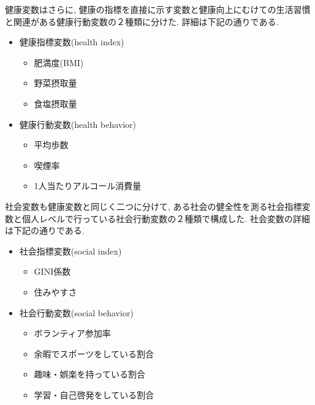 健康変数はさらに, 健康の指標を直接に示す変数と健康向上にむけての生活習慣と関連がある健康行動変数の２種類に分けた. 詳細は下記の通りである.
\begin{itemize} \setlength{\itemsep}{-0.5mm} \setlength{\parskip}{-0.5mm}
	\item 健康指標変数(health index)
	      \begin{itemize} \setlength{\itemsep}{-0.5mm} \setlength{\parskip}{-0.5mm}
		      \item 	肥満度(BMI)
		      \item 	野菜摂取量
		      \item 	食塩摂取量
	      \end{itemize}

	\item 健康行動変数(health behavior)
	      \begin{itemize} \setlength{\itemsep}{-0.5mm} \setlength{\parskip}{-0.5mm}
		      \item 	平均歩数
		      \item 	喫煙率
		      \item 	1人当たりアルコール消費量
	      \end{itemize}
\end{itemize}

社会変数も健康変数と同じく二つに分けて, ある社会の健全性を測る社会指標変数と個人レベルで行っている社会行動変数の２種類で構成した. 社会変数の詳細は下記の通りである.

\begin{itemize} \setlength{\itemsep}{-0.5mm} \setlength{\parskip}{-0.5mm}
	\item 社会指標変数(social index)
	      \begin{itemize} \setlength{\itemsep}{-0.5mm} \setlength{\parskip}{-0.5mm}
		      \item 	GINI係数
		      \item 	住みやすさ　%
	      \end{itemize}
	\item 社会行動変数(social behavior)
	      \begin{itemize} \setlength{\itemsep}{-0.5mm} \setlength{\parskip}{-0.5mm}
		      \item 	ボランティア参加率
		      \item 	余暇でスポーツをしている割合
		      \item 	趣味・娯楽を持っている割合
		      \item 	学習・自己啓発をしている割合
	      \end{itemize}
\end{itemize}

